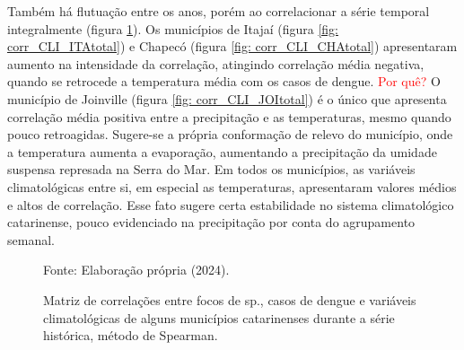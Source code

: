 \documentclass[
	12pt,				%
	openright,			%
	oneside,			%
	a4paper,			%
	english,			%
	french,				%
	spanish,			%
	brazil				%
	dvipsnames, table]{abntex2}
\begin{document}
Também há flutuação entre os anos, porém ao correlacionar a série temporal integralmente (figura \ref{fig: matriz_corr_CLItotal}). Os municípios de Itajaí (figura \ref{fig: corr_CLI_ITAtotal}) e Chapecó (figura \ref{fig: corr_CLI_CHAtotal}) apresentaram aumento na intensidade da correlação, atingindo correlação média negativa, quando se retrocede a temperatura média com os casos de dengue. \textcolor{red}{Por quê?} O município de Joinville (figura \ref{fig: corr_CLI_JOItotal}) é o único que apresenta correlação média positiva entre a precipitação e as temperaturas, mesmo quando pouco retroagidas. Sugere-se a própria conformação de relevo do município, onde a temperatura aumenta a evaporação, aumentando a precipitação da umidade suspensa represada na Serra do Mar. Em todos os municípios, as variáveis climatológicas entre si, em especial as temperaturas, apresentaram valores médios e altos de correlação. Esse fato sugere certa estabilidade no sistema climatológico catarinense, pouco evidenciado na precipitação por conta do agrupamento semanal.

\begin{figure}[htbp]
    \begin{center}
    \caption{Matriz de correlações entre focos de  sp., casos de dengue e variáveis climatológicas de alguns municípios catarinenses durante a série histórica, método de Spearman.}
    \label{fig: matriz_corr_CLItotal}
    \hfill
    \hfill
    \end{center}
    \small{Fonte: Elaboração própria (2024).}
\end{figure}
\end{document}
